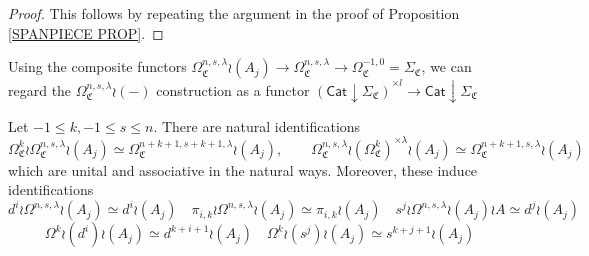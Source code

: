\documentclass[a4paper,10pt
,draft
]{article}%
\renewcommand{\1}{\eta}%
\newcommand{\OC}{\Omega_{\mathfrak C}}
\begin{document}
\begin{proof}
This follows by repeating the argument in the proof of Proposition \ref{SPANPIECE PROP}.
\end{proof}


 
Using the composite functors
$\Omega_{\mathfrak{C}}^{n,s,\lambda} \wr (A_j)
\to \Omega_{\mathfrak{C}}^{n,s,\lambda} 
\to \Omega^{-1,0}_{\mathfrak{C}} = \Sigma_{\mathfrak{C}}$,
we can regard the 
$\Omega_{\mathfrak{C}}^{n,s,\lambda} \wr (-)$
construction as a functor
$\left(\mathsf{Cat}\downarrow \Sigma_{\mathfrak{C}}\right)^{\times l}
\to \mathsf{Cat}\downarrow \Sigma_{\mathfrak{C}}$

\begin{corollary}
      \label{LABIDEN_COR}
Let $-1 \leq k, -1 \leq s \leq n$.
There are natural identifications
\[
	\OC^k \wr \OC^{n,s,\lambda} \wr (A_j) \simeq
	\OC^{n+k+1,s+k+1,\lambda} \wr (A_j),
\qquad
	\OC^{n,s,\lambda} \wr (\OC^k)^{\times \lambda} \wr (A_j) \simeq
	\OC^{n+k+1,s,\lambda} \wr (A_j)	
\]
which are unital and associative in the natural ways.
Moreover, these induce identifications
\[
d^i \wr \Omega^{n,s,\lambda} \wr (A_j) \simeq d^i \wr (A_j)
	\quad
\pi_{i,k} \wr \Omega^{n,s,\lambda} \wr (A_j) \simeq \pi_{i,k} \wr (A_j)
	\quad
s^j \wr \Omega^{n,s,\lambda} \wr (A_j) \wr A \simeq d^j \wr  (A_j)
\]
\[
\Omega^k \wr (d^i) \wr (A_j) \simeq d^{k+i+1} \wr (A_j)
	\quad
\Omega^k \wr (s^j) \wr (A_j) \simeq s^{k+j+1} \wr (A_j)
\]
\end{corollary}
\end{document}
